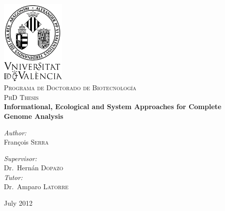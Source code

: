 \documentclass[english,b5paper,11pt]{scrbook} %
\begin{document}
\begin{titlepage}
  \begin{center}
    \includegraphics[width=90pt]{figures/other/escudo.png}\\[.8cm]
    \textsc{\LARGE Programa de Doctorado de Biotecnología}\\[1.5cm]
    \textsc{\Large PhD Thesis}\\[0.9cm]
    
    { \huge \bfseries Informational, Ecological and System Approaches for Complete Genome Analysis}\\[3.4cm]
    \begin{minipage}{0.4\textwidth}
      \begin{flushleft} \large
        \emph{Author:}\\
        François \textsc{Serra}
      \end{flushleft}
    \end{minipage}
    \begin{minipage}{0.4\textwidth}
      \begin{flushright} \large
        \emph{Supervisor:} \\
        Dr.~Hernán \textsc{Dopazo} \\[0.4cm]
        \emph{Tutor:} \\
        Dr.~Amparo \textsc{Latorre}
      \end{flushright}
    \end{minipage}
    \vfill
    {\large July 2012}
  \end{center}
  \newpage
 \thispagestyle{empty}
 \mbox{}
\newpage 
\end{titlepage}


\pagestyle{empty}
\thispagestyle{empty}
\begin{titlepage}
  \fancyhf{}
  \newpage
\end{titlepage}
\pagestyle{empty}
\thispagestyle{empty}

\end{document}

